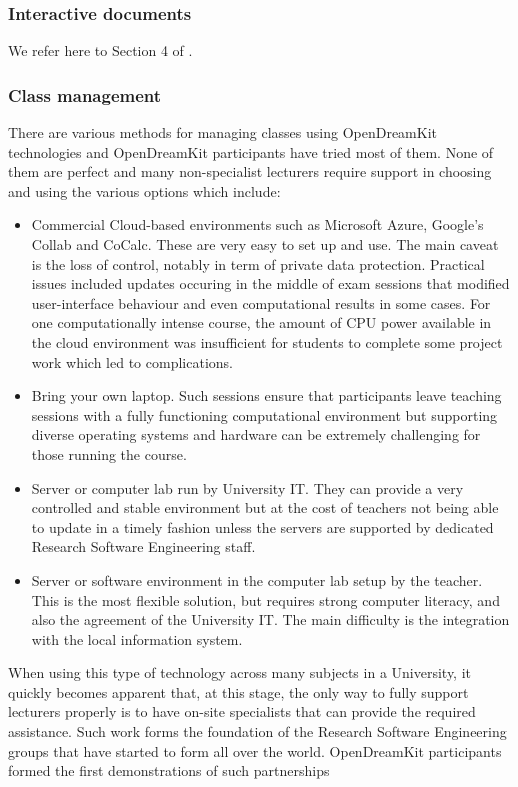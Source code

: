 \documentclass{deliverablereport}
\begin{document}
\subsubsection{Interactive documents}

We refer here to Section 4 of .

\subsubsection{Class management}

There are various methods for managing classes using OpenDreamKit
technologies and OpenDreamKit participants have tried most of them. None
of them are perfect and many non-specialist lecturers require support in
choosing and using the various options which include:

\begin{itemize}
\tightlist
\item Commercial Cloud-based environments such as Microsoft Azure,
  Google's Collab and CoCalc. These are very easy to set up and use.
  The main caveat is the loss of control, notably in term of private
  data protection. Practical issues included updates occuring in the middle of exam
  sessions that modified user-interface behaviour and even computational
  results in some cases. For one computationally intense course, the
  amount of CPU power available in the cloud environment was
  insufficient for students to complete some project work which led to
  complications.
\item
  Bring your own laptop. Such sessions ensure that participants leave
  teaching sessions with a fully functioning computational environment
  but supporting diverse operating systems and hardware can be extremely
  challenging for those running the course.
\item Server or computer lab run by University IT. They can provide a
  very controlled and stable environment but at the cost of teachers
  not being able to update in a timely fashion unless the servers are
  supported by dedicated Research Software Engineering staff.
\item Server or software environment in the computer lab setup by the
  teacher. This is the most flexible solution, but requires strong
  computer literacy, and also the agreement of the University IT. The main
  difficulty is the integration with the local information system.
\end{itemize}

When using this type of technology across many subjects in a
University, it quickly becomes apparent that, at this stage, the only
way to fully support lecturers properly is to have on-site specialists
that can provide the required assistance. Such work forms the
foundation of the Research Software Engineering groups that have
started to form all over the world. OpenDreamKit participants formed
the first demonstrations of such partnerships
\end{document}
